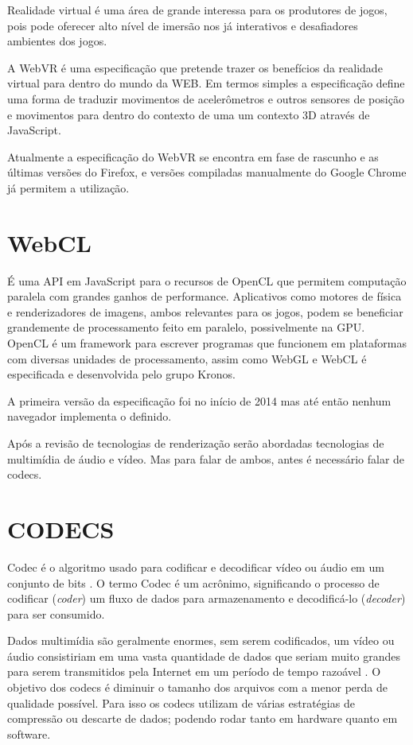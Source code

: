 Realidade virtual é uma área de grande interessa para os produtores
de jogos, pois pode oferecer alto nível de imersão nos já
interativos e desafiadores ambientes dos jogos.

A WebVR é uma especificação que pretende trazer os benefícios
da realidade virtual para dentro do mundo da WEB. Em termos simples
a especificação define uma forma de traduzir movimentos de
acelerômetros e outros sensores de posição e movimentos para dentro
do contexto de uma um contexto 3D através de JavaScript.

Atualmente a especificação do WebVR se encontra em fase de rascunho e
as últimas versões do Firefox, e versões compiladas manualmente do
Google Chrome já permitem a utilização.
\section{WebCL}
É uma API em JavaScript para o recursos de OpenCL que permitem
computação paralela com grandes ganhos de performance. Aplicativos
como motores de física e renderizadores de imagens, ambos relevantes
para os jogos, podem se beneficiar grandemente de processamento feito
em paralelo, possivelmente na GPU. OpenCL é um framework para escrever
programas que funcionem em plataformas com diversas unidades de
processamento, assim como WebGL e WebCL é especificada e desenvolvida
pelo grupo Kronos.

A primeira versão da especificação foi no início de 2014 mas até
então nenhum navegador implementa o definido.

Após a revisão de tecnologias de renderização serão abordadas tecnologias de 
multimídia de áudio e vídeo. Mas para falar de ambos, antes é necessário falar de codecs.

\section{CODECS}

Codec é o algoritmo usado para codificar e decodificar vídeo ou
áudio em um conjunto de bits \autocite{diveIntohtml}. O termo Codec é
um acrônimo, significando o processo de codificar (\textit{coder}) um fluxo de dados
para armazenamento e decodificá-lo (\textit{decoder}) para ser consumido.

Dados multimídia são geralmente enormes, sem serem codificados,
um vídeo ou áudio consistiriam em uma vasta quantidade de dados
que seriam muito grandes para serem transmitidos pela Internet em um
período de tempo razoável \autocite[pp. 66]{proHtml5}. O objetivo dos
codecs é diminuir o tamanho dos arquivos com a menor perda de qualidade
possível. Para isso os codecs utilizam de várias estratégias de
compressão ou descarte de dados; podendo rodar tanto em hardware quanto
em software.

